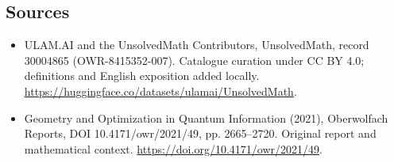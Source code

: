 \documentclass[11pt]{article}
\begin{document}
\subsection{Sources}
\begin{itemize}
\item[\hypertarget{source:30004865:1}{S1}] ULAM.AI and the UnsolvedMath Contributors, UnsolvedMath, record 30004865 (OWR-8415352-007). Catalogue curation under CC BY 4.0; definitions and English exposition added locally.
\url{https://huggingface.co/datasets/ulamai/UnsolvedMath}.
\item[\hypertarget{source:30004865:2}{S2}] Geometry and Optimization in Quantum Information (2021), Oberwolfach Reports, DOI 10.4171/owr/2021/49, pp. 2665--2720. Original report and mathematical context.
\url{https://doi.org/10.4171/owr/2021/49}.
\end{itemize}
\label{end:30004865}
\end{document}
